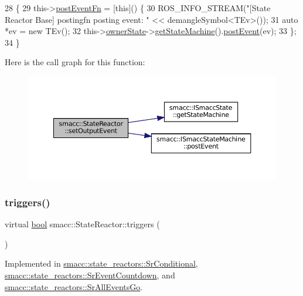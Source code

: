 \begin{DoxyCode}
28 \{
29     this->\hyperlink{classsmacc_1_1StateReactor_a1d97ae5c1689b6716c60c19c94a7eeae}{postEventFn} = [\textcolor{keyword}{this}]() \{
30         ROS\_INFO\_STREAM(\textcolor{stringliteral}{"[State Reactor Base] postingfn posting event: "} << demangleSymbol<TEv>());
31         \textcolor{keyword}{auto} *ev = \textcolor{keyword}{new} TEv();
32         this->\hyperlink{classsmacc_1_1StateReactor_aabd30af9412a8fea9ec5906f173d9d4a}{ownerState}->\hyperlink{classsmacc_1_1ISmaccState_a562bb3f9a3ac16b8be71e4794c9e7523}{getStateMachine}().\hyperlink{classsmacc_1_1ISmaccStateMachine_ad80cdd7bbc9a9f3b221c625754fed1ed}{postEvent}(ev);
33     \};
34 \}
\end{DoxyCode}
Here is the call graph for this function\+:
\nopagebreak
\begin{figure}[H]
\begin{center}
\leavevmode
\includegraphics[width=350pt]{classsmacc_1_1StateReactor_ae9d0dd0c8cdcc57f8881f0962040c8ed_cgraph}
\end{center}
\end{figure}
\mbox{\label{classsmacc_1_1StateReactor_a445bc3c90980d75d7d815b85cfb68b21}} 
\subsubsection{\texorpdfstring{triggers()}{triggers()}}
{\footnotesize\ttfamily virtual \hyperlink{classbool}{bool} smacc\+::\+State\+Reactor\+::triggers (\begin{DoxyParamCaption}{ }\end{DoxyParamCaption})\hspace{0.3cm}{\ttfamily [pure virtual]}}



Implemented in \hyperlink{classsmacc_1_1state__reactors_1_1SrConditional_acbd91c59644957faac4e9d7716513cb4}{smacc\+::state\+\_\+reactors\+::\+Sr\+Conditional}, \hyperlink{classsmacc_1_1state__reactors_1_1SrEventCountdown_aff678113dbd07339e5e3736e4aa00c81}{smacc\+::state\+\_\+reactors\+::\+Sr\+Event\+Countdown}, and \hyperlink{classsmacc_1_1state__reactors_1_1SrAllEventsGo_ab752043eda070661d2a676b580c679b7}{smacc\+::state\+\_\+reactors\+::\+Sr\+All\+Events\+Go}.



